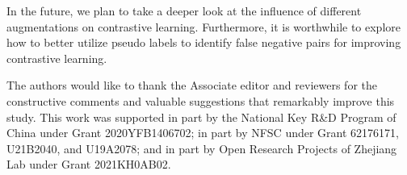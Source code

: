 In the future, we plan to take a deeper look at the influence of different augmentations on contrastive learning. Furthermore, it is worthwhile to explore how to better utilize pseudo labels to identify false negative pairs for improving contrastive learning. 

\begin{acknowledgements}
The authors would like to thank the Associate editor and reviewers for the constructive comments and valuable suggestions that remarkably improve this study. 
This work was supported in part by the National Key R\&D Program of China under Grant 2020YFB1406702; in part by NFSC under Grant 62176171, U21B2040, and U19A2078;  and in part by Open Research Projects of Zhejiang Lab under Grant 2021KH0AB02. 
\end{acknowledgements}





                      


